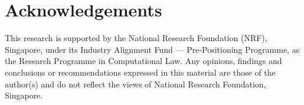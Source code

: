 \documentclass[11pt]{article}
\begin{document}
%





    




\section*{Acknowledgements}

This research is supported by the National Research Foundation (NRF), Singapore, under its Industry Alignment Fund --- Pre-Positioning Programme, as the Research Programme in Computational Law. Any opinions, findings and conclusions or recommendations expressed in this material are those of the author(s) and do not reflect the views of National Research Foundation, Singapore.



\end{document}

